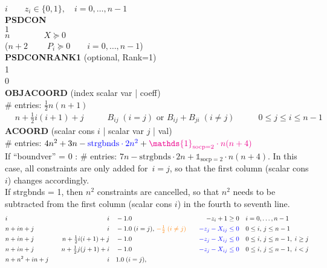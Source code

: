 \documentclass[11pt,a4paper]{article}
\newcommand{\ones}{\mathds{1}}
\theoremstyle{definition}
\begin{document}
{$i \qquad z_i \in \{0,1\}, \quad i = 0,\dots,n-1$ \\
\textbf{PSDCON} \\
$1$  \\
$n \qquad \qquad X \succeq 0$ \\
{\color{red}($n+2 \qquad \; P_i \succeq 0 \qquad i = 0,\dots,n-1$)} \\
{\color{green}\textbf{PSDCONRANK1} (optional, Rank=1) \\
1 \\
0\\}
\textbf{OBJACOORD} (index scalar var | coeff) \\
\# entries: $\tfrac{1}{2}n(n+1)$\\
\[
  \begin{aligned}
    &n+\tfrac{1}{2}i(i+1)+j \qquad & B_{ij} \; (i=j) \text{ or } B_{ij} +
    B_{ji} \; (i\neq j) \qquad & 0 \leq j \leq i \leq n-1
  \end{aligned}
\]
\textbf{ACOORD} (scalar cons $i$ | scalar var $j$ | val) \\
\# entries: $4n^2+3n - {\color{blue} \text{strgbnds}\cdot 2n^2} +
{\color{magenta} \ones_{\text{socp} = 2} \cdot n(n+4)}$ \\
{\color{violet} If ``boundver'' = 0 : \# entries:
  $7n - \text{strgbnds}\cdot 2n + \ones_{\text{socp} = 2} \cdot n(n+4)$. In
  this case, all constraints are only added
  for~$i=j$, so that the first column (scalar cons $i$) changes accordingly.} \\
{\color{blue} If strgbnds = 1, then $n^2$ constraints are cancelled, so
  that $n^2$ needs to be subtracted from the first column (scalar cons $i$)
  in the fourth to seventh line.}
\[
  \begin{aligned}
    & i \quad & i \quad & -1.0 \quad & -z_i + 1 \geq 0 \quad & i =
    0,\dots,n-1 \\
    & n+in+j \quad & i \quad & -1.0\; (i = j),\, {\color{orange}
      -\tfrac{1}{2}\; (i\neq j)} \quad & {\color{blue}-z_j - X_{ij} \leq 0}
    \quad & 0 \leq i,\, j \leq n-1\\
    & n+in+j \quad & n+\tfrac{1}{2}i(i+1)+j \quad & -1.0 \quad &
    {\color{blue}-z_j - X_{ij} \leq 0} \quad & 0 \leq i,\, j \leq
    n-1, \; i \geq j \\
    & n+in+j \quad & n+\tfrac{1}{2}j(j+1)+i \quad & -1.0 \quad &
    {\color{blue}-z_j - X_{ij} \leq 0} \quad & 0 \leq i,\, j \leq
    n-1, \; i < j \\
    & n+n^2+in+j \quad & i \quad & 1.0\; (i = j),\, {\color{orange}
}
\end{aligned}\]}
\end{document}
